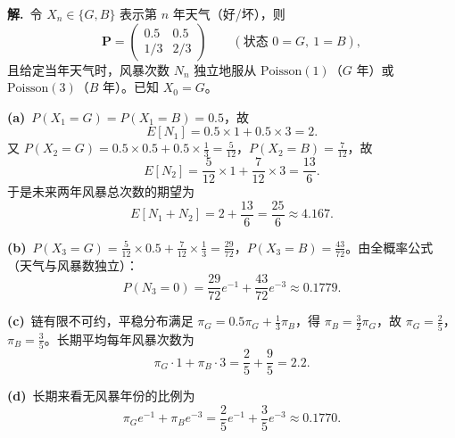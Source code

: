 \documentclass[12pt,a4paper]{article}
\begin{document}
\begin{answerbox}
\textbf{解.}\ 令 $X_n\in\{G,B\}$ 表示第 $n$ 年天气（好/坏），则
\[
\mathbf{P}=\begin{pmatrix}0.5&0.5\\[2pt]1/3&2/3\end{pmatrix}
\qquad(\text{状态 }0=G,\ 1=B),
\]
且给定当年天气时，风暴次数 $N_n$ 独立地服从 $\mathrm{Poisson}(1)$（$G$ 年）或 $\mathrm{Poisson}(3)$（$B$ 年）。已知 $X_0=G$。

\textbf{(a)}\ $P(X_1=G)=P(X_1=B)=0.5$，故
\[
E[N_1]=0.5\times1+0.5\times3=2 .
\]
又 $P(X_2=G)=0.5\times0.5+0.5\times\frac13=\frac{5}{12}$，$P(X_2=B)=\frac{7}{12}$，故
\[
E[N_2]=\frac{5}{12}\times1+\frac{7}{12}\times3=\frac{13}{6} .
\]
于是未来两年风暴总次数的期望为
\[
E[N_1+N_2]=2+\frac{13}{6}=\dfrac{25}{6}\approx 4.167 .
\]

\textbf{(b)}\ $P(X_3=G)=\frac{5}{12}\times0.5+\frac{7}{12}\times\frac13=\frac{29}{72}$，$P(X_3=B)=\frac{43}{72}$。由全概率公式（天气与风暴数独立）：
\[
P(N_3=0)=\frac{29}{72}e^{-1}+\frac{43}{72}e^{-3}\approx 0.1779 .
\]

\textbf{(c)}\ 链有限不可约，平稳分布满足 $\pi_G=0.5\pi_G+\frac13\pi_B$，得 $\pi_B=\frac32\pi_G$，故 $\pi_G=\frac25$，$\pi_B=\frac35$。长期平均每年风暴次数为
\[
\pi_G\cdot1+\pi_B\cdot3=\frac25+\frac95=2.2 .
\]

\textbf{(d)}\ 长期来看无风暴年份的比例为
\[
\pi_G e^{-1}+\pi_B e^{-3}=\frac25 e^{-1}+\frac35 e^{-3}\approx 0.1770 .
\]
\end{answerbox}
\end{document}
